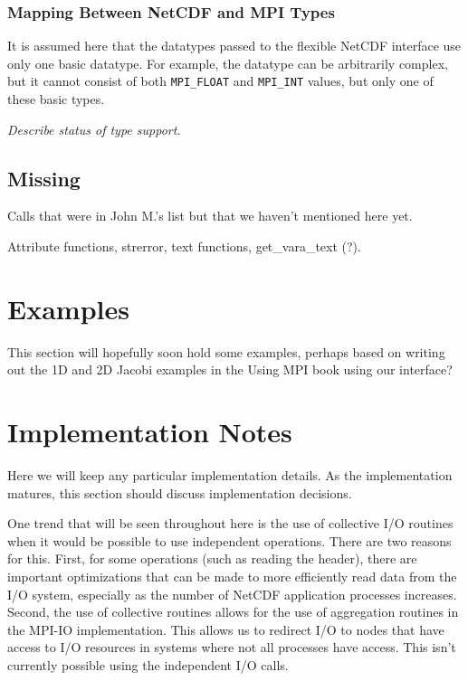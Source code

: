 \documentclass[10pt]{article}
\begin{document}
\subsubsection{Mapping Between NetCDF and MPI Types}

It is assumed here that the datatypes passed to the flexible NetCDF interface
use only one basic datatype.  For example, the datatype can be arbitrarily
complex, but it cannot consist of both \texttt{MPI\_FLOAT} and
\texttt{MPI\_INT} values, but only one of these basic types.

\emph{Describe status of type support.}


\subsection{Missing}

Calls that were in John M.'s list but that we haven't mentioned here yet.

Attribute functions, strerror, text functions, get\_vara\_text (?).

\section{Examples}

This section will hopefully soon hold some examples, perhaps based on writing
out the 1D and 2D Jacobi examples in the Using MPI book using our interface?

\section{Implementation Notes}

Here we will keep any particular implementation details.  As the
implementation matures, this section should discuss implementation decisions.

One trend that will be seen throughout here is the use of collective I/O
routines when it would be possible to use independent operations.  There are
two reasons for this.  First, for some operations (such as reading the
header), there are important optimizations that can be made to more
efficiently read data from the I/O system, especially as the number of NetCDF
application processes increases.  Second, the use of collective routines
allows for the use of aggregation routines in the MPI-IO implementation.  This
allows us to redirect I/O to nodes that have access to I/O resources in
systems where not all processes have access.  This isn't currently possible
using the independent I/O calls.
\end{document}
